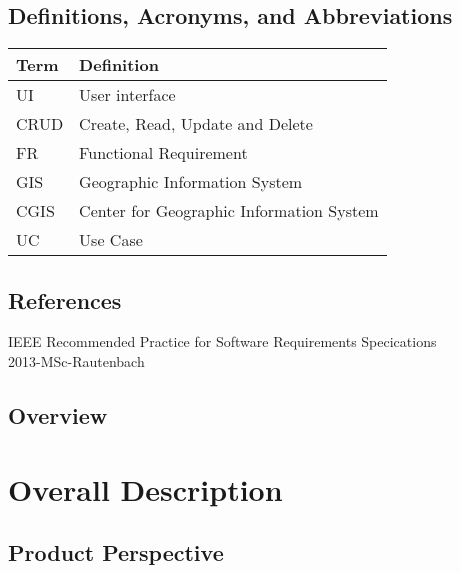 \documentclass{article}
\begin{document}
        \subsection{Definitions, Acronyms, and Abbreviations}
            \begin{table}[ht!]
	\centering
	\begin{tabular}{|p{4cm}|p{7cm}|}
		\hline
		\textbf{Term} & \textbf{Definition} \\		
		\hline
		UI & User interface \\
        \hline
		CRUD & Create, Read, Update and Delete \\
		\hline
		FR & Functional Requirement \\
		\hline
		GIS & Geographic Information System \\
		\hline
		CGIS & Center for Geographic Information System \\
		\hline
		UC & Use Case\\
		\hline
	\end{tabular}
\end{table}
            
            
        \subsection{References}
        {IEEE Recommended Practice for Software Requirements Specications\\
        2013-MSc-Rautenbach}
        \subsection{Overview}
	
	\section{Overall Description}
		
        \subsection{Product Perspective}
        
\end{document}

